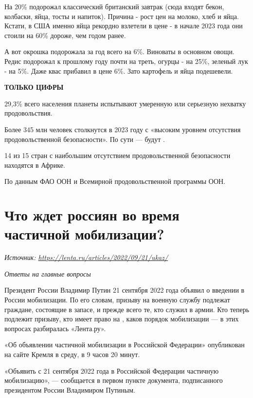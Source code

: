 На 20\% подорожал классический британский завтрак (сюда входят бекон, колбаски, яйца, тосты и напиток). Причина - рост цен на молоко, хлеб и яйца. Кстати, в США именно яйца рекордно взлетели в цене - в начале 2023 года они стоили на 60\% дороже, чем годом ранее.

А вот окрошка подорожала за год всего на 6\%. Виноваты в основном овощи. Редис подорожал к прошлому году почти на треть, огурцы - на 25\%, зеленый лук - на 5\%. Даже квас прибавил в цене 6\%. Зато картофель и яйца подешевели.

\textbf{ТОЛЬКО ЦИФРЫ}

29,3\% всего населения планеты испытывают умеренную или серьезную нехватку продовольствия.

Более 345 млн человек столкнутся в 2023 году с «высоким уровнем отсутствия продовольственной безопасности». По сути --- будут .

14 из 15 стран с наибольшим отсутствием продовольственной безопасности находятся в Африке.

По данным ФАО ООН и Всемирной продовольственной программы ООН.


\clearpage


\section{Что ждет россиян во время частичной мобилизации?}
\textit{Источник: \url{https://lenta.ru/articles/2022/09/21/ukaz/}}

\textit{Ответы на главные вопросы}

Президент России Владимир Путин 21 сентября 2022 года объявил о введении в России  мобилизации. По его словам, призыву на военную службу подлежат граждане, состоящие в запасе, и прежде всего те, кто служил в армии. Кто теперь подлежит призыву, кто имеет право на , каков порядок мобилизации — в этих вопросах разбиралась «Лента.ру».

 «Об объявлении частичной мобилизации в Российской Федерации» опубликован на сайте Кремля в среду, в 9 часов 20 минут.

«Объявить с 21 сентября 2022 года в Российской Федерации частичную мобилизацию», — сообщается в первом пункте документа, подписанного президентом России Владимиром Путиным.

